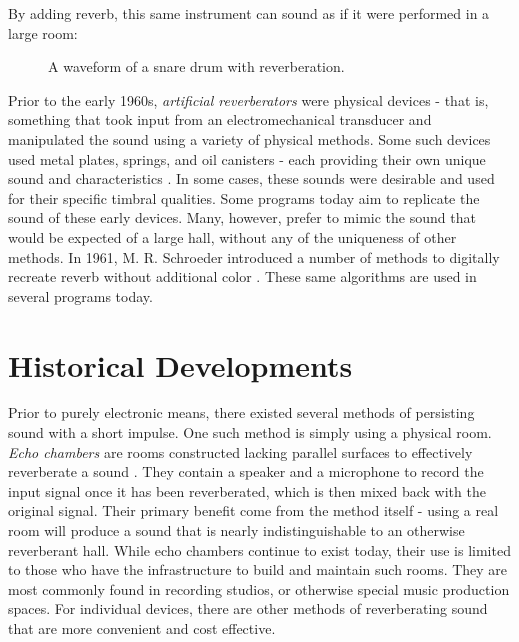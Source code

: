 By adding reverb, this same instrument can sound as if it were performed in a large room:

\begin{figure}[h] %
	\begin{center}
		\caption{A waveform of a snare drum with reverberation.}
	\end{center}
\end{figure} %

Prior to the early 1960s, \textit{artificial reverberators} were physical devices - that is, something that took input from an electromechanical transducer and manipulated the sound using a variety of physical methods. Some such devices used metal plates, springs, and oil canisters - each providing their own unique sound and characteristics \cite{FiftyYears}. In some cases, these sounds were desirable and used for their specific timbral qualities. Some programs today aim to replicate the sound of these early devices. Many, however, prefer to mimic the sound that would be expected of a large hall, without any of the uniqueness of other methods. In 1961, M. R. Schroeder introduced a number of methods to digitally recreate reverb without additional color \cite{schroeder1961natural}. These same algorithms are used in several programs today.

\section{Historical Developments}
Prior to purely electronic means, there existed several methods of persisting sound with a short impulse. One such method is simply using a physical room. \textit{Echo chambers} are rooms constructed lacking parallel surfaces to effectively reverberate a sound \cite{FiftyYears}. They contain a speaker and a microphone to record the input signal once it has been reverberated, which is then mixed back with the original signal. Their primary benefit come from the method itself - using a real room will produce a sound that is nearly indistinguishable to an otherwise reverberant hall. While echo chambers continue to exist today, their use is limited to those who have the infrastructure to build and maintain such rooms. They are most commonly found in recording studios, or otherwise special music production spaces. For individual devices, there are other methods of reverberating sound that are more convenient and cost effective.

